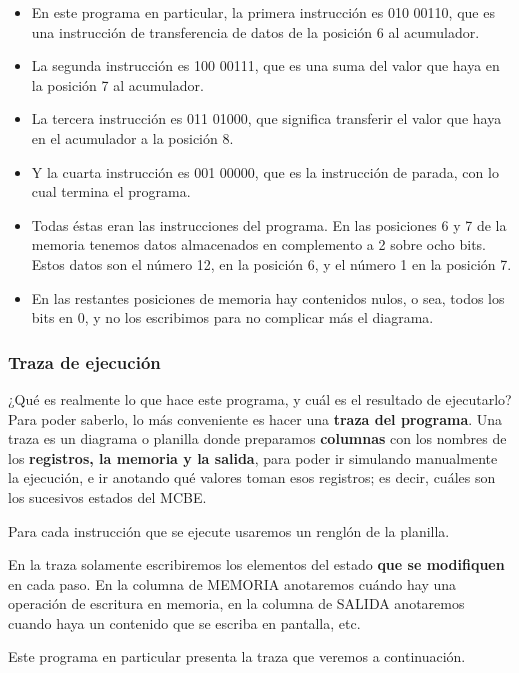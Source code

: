 \documentclass[spanish,a4paper,]{article}
\providecommand{\tightlist}{%
  \setlength{\itemsep}{0pt}\setlength{\parskip}{0pt}}
\begin{document}
\begin{itemize}
\tightlist
\item
  En este programa en particular, la primera instrucción es 010 00110,
  que es una instrucción de transferencia de datos de la posición 6 al
  acumulador.
\item
  La segunda instrucción es 100 00111, que es una suma del valor que
  haya en la posición 7 al acumulador.
\item
  La tercera instrucción es 011 01000, que significa transferir el valor
  que haya en el acumulador a la posición 8.
\item
  Y la cuarta instrucción es 001 00000, que es la instrucción de parada,
  con lo cual termina el programa.
\item
  Todas éstas eran las instrucciones del programa. En las posiciones 6 y
  7 de la memoria tenemos datos almacenados en complemento a 2 sobre
  ocho bits. Estos datos son el número 12, en la posición 6, y el número
  1 en la posición 7.
\item
  En las restantes posiciones de memoria hay contenidos nulos, o sea,
  todos los bits en 0, y no los escribimos para no complicar más el
  diagrama.
\end{itemize}

\hypertarget{traza-de-ejecuciuxf3n}{%
\subsubsection{Traza de ejecución}\label{traza-de-ejecuciuxf3n}}

¿Qué es realmente lo que hace este programa, y cuál es el resultado de
ejecutarlo? Para poder saberlo, lo más conveniente es hacer una
\textbf{traza del programa}. Una traza es un diagrama o planilla donde
preparamos \textbf{columnas} con los nombres de los \textbf{registros,
la memoria y la salida}, para poder ir simulando manualmente la
ejecución, e ir anotando qué valores toman esos registros; es decir,
cuáles son los sucesivos estados del MCBE.

Para cada instrucción que se ejecute usaremos un renglón de la planilla.

En la traza solamente escribiremos los elementos del estado \textbf{que
se modifiquen} en cada paso. En la columna de MEMORIA anotaremos cuándo
hay una operación de escritura en memoria, en la columna de SALIDA
anotaremos cuando haya un contenido que se escriba en pantalla, etc.

Este programa en particular presenta la traza que veremos a
continuación.
\end{document}
